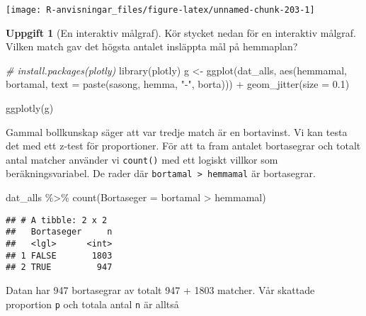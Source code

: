 \documentclass[
]{book}
\newenvironment{Shaded}{\begin{snugshade}}{\end{snugshade}}
\newcommand{\AttributeTok}[1]{\textcolor[rgb]{0.77,0.63,0.00}{#1}}
\newcommand{\CommentTok}[1]{\textcolor[rgb]{0.56,0.35,0.01}{\textit{#1}}}
\newcommand{\FloatTok}[1]{\textcolor[rgb]{0.00,0.00,0.81}{#1}}
\newcommand{\FunctionTok}[1]{\textcolor[rgb]{0.00,0.00,0.00}{#1}}
\newcommand{\NormalTok}[1]{#1}
\newcommand{\OtherTok}[1]{\textcolor[rgb]{0.56,0.35,0.01}{#1}}
\newcommand{\SpecialCharTok}[1]{\textcolor[rgb]{0.00,0.00,0.00}{#1}}
\newcommand{\StringTok}[1]{\textcolor[rgb]{0.31,0.60,0.02}{#1}}
\theoremstyle{definition}
\theoremstyle{definition}
\theoremstyle{definition}
\newtheorem{exercise}{Uppgift}[chapter]
\theoremstyle{definition}
\theoremstyle{remark}
\begin{document}
\begin{center}\texttt{[image: R-anvisningar\_files/figure-latex/unnamed-chunk-203-1]} \end{center}

\begin{exercise}[En interaktiv målgraf]

Kör stycket nedan för en interaktiv målgraf. Vilken match gav det högsta antalet insläppta mål på hemmaplan?

\begin{Shaded}
\begin{Highlighting}[]
\CommentTok{\# install.packages(plotly)}
\FunctionTok{library}\NormalTok{(plotly)}
\NormalTok{g }\OtherTok{\textless{}{-}} \FunctionTok{ggplot}\NormalTok{(dat\_alls, }\FunctionTok{aes}\NormalTok{(hemmamal, bortamal, }\AttributeTok{text =} \FunctionTok{paste}\NormalTok{(sasong, hemma, }\StringTok{"{-}"}\NormalTok{, borta))) }\SpecialCharTok{+}
  \FunctionTok{geom\_jitter}\NormalTok{(}\AttributeTok{size =} \FloatTok{0.1}\NormalTok{)}

\FunctionTok{ggplotly}\NormalTok{(g)}
\end{Highlighting}
\end{Shaded}

\end{exercise}

Gammal bollkunskap säger att var tredje match är en bortavinst. Vi kan testa det med ett z-test för proportioner. För att ta fram antalet bortasegrar och totalt antal matcher använder vi \texttt{count()} med ett logiskt villkor som beräkningsvariabel. De rader där \texttt{bortamal\ \textgreater{}\ hemmamal} är bortasegrar.

\begin{Shaded}
\begin{Highlighting}[]
\NormalTok{dat\_alls }\SpecialCharTok{\%\textgreater{}\%} \FunctionTok{count}\NormalTok{(}\AttributeTok{Bortaseger =}\NormalTok{ bortamal }\SpecialCharTok{\textgreater{}}\NormalTok{ hemmamal)}
\end{Highlighting}
\end{Shaded}

\begin{verbatim}
## # A tibble: 2 x 2
##   Bortaseger     n
##   <lgl>      <int>
## 1 FALSE       1803
## 2 TRUE         947
\end{verbatim}

Datan har 947 bortasegrar av totalt 947 + 1803 matcher. Vår skattade proportion \texttt{p} och totala antal \texttt{n} är alltså
\end{document}
